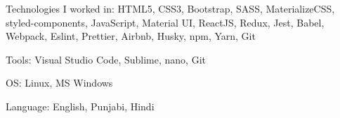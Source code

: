 \cventry{}
    {Technologies I worked in:}
    {}
    {HTML5, CSS3, Bootstrap, SASS, MaterializeCSS, styled-components, JavaScript, Material UI, ReactJS, Redux, Jest, Babel, Webpack, Eslint, Prettier, Airbnb, Husky, npm, Yarn, Git}
    {}
    {}

\cventry{}
    {Tools:}
    {}
    {Visual Studio Code, Sublime, nano, Git}
    {}
    {}

\cventry{}
    {OS:}
    {}
    {Linux, MS Windows}
    {}
    {}


\cventry{}
    {Language:}
    {}
    {English, Punjabi, Hindi}
    {}
    {}


